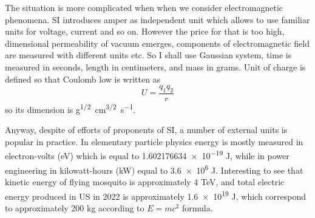 The situation is more complicated when when we consider electromagnetic phenomena. SI introduces
amper as independent unit which allows to use familiar units for voltage, current and so on.
However the price for that is too high, dimensional permeability of vacuum emerges, components
of electromagnetic field are measured with different units etc. So I shall use Gaussian system,
time is measured in seconds, length in centimeters, and mass in grams. Unit of charge is defined
so that Coulomb low is written as
\[ U= \frac{q_1 q_2}{r} \]
so its dimension is \unit{g^{1/2}.cm^{3/2}.s^{-1}}. 

Anyway, despite of efforts of proponents of SI, a number of external units is popular in practice.
In elementary particle physics energy is mostly measured in electron-volts (\unit{eV}) 
which is equal to  \num{1.602176634e-19} J,
while in
power engineering  in kilowatt-hours (\unit{kW}) equal to \num{3.6e6} J.
Interesting to see that kinetic energy of flying mosquito is approximately 4 \unit{TeV}, and total electric energy 
produced in US in 2022 is approximately \num{1.6e19} J, which correspond to approximately 200 \unit{kg}
according to $ E=m c^2 $ formula.

